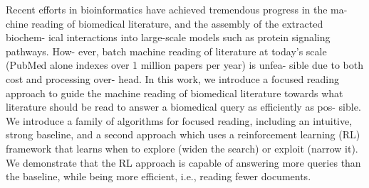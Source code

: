 Recent efforts in bioinformatics have achieved tremendous progress in the ma- chine reading of biomedical literature, and the assembly of the extracted biochem- ical interactions into large-scale models such as protein signaling pathways. How- ever, batch machine reading of literature at today's scale (PubMed alone indexes over 1 million papers per year) is unfea- sible due to both cost and processing over- head. In this work, we introduce a focused reading approach to guide the machine reading of biomedical literature towards what literature should be read to answer a biomedical query as efficiently as pos- sible. We introduce a family of algorithms for focused reading, including an intuitive, strong baseline, and a second approach which uses a reinforcement learning (RL) framework that learns when to explore (widen the search) or exploit (narrow it). We demonstrate that the RL approach is capable of answering more queries than the baseline, while being more efficient, i.e., reading fewer documents.
